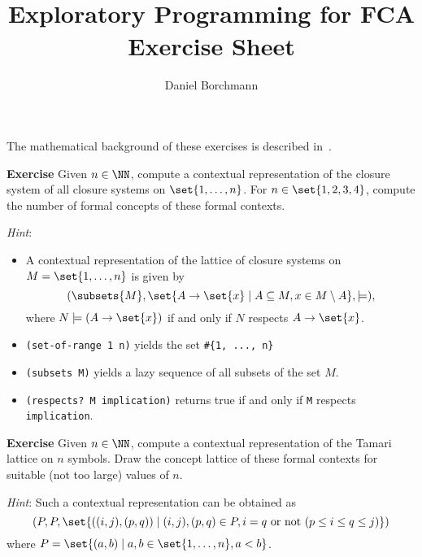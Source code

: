 \documentclass{article}
\title{\cclj\\ Exploratory Programming for FCA\\ Exercise Sheet}
\author{Daniel Borchmann}
\newcounter{exercise}
\newenvironment{exercise}{\bigskip\stepcounter{exercise}\noindent\begingroup\textbf{Exercise
    \theexercise}\hspace*{.3cm}}{\endgroup}
\newcommand{\hint}{\medskip\noindent\emph{Hint}: }
\begin{document}
\maketitle

\noindent The mathematical background of these exercises is described in~\cite{fca-book}.

\begin{exercise}
  Given $n \in \NN$, compute a contextual representation of the closure system of all
  closure systems on $\set{ 1, \ldots, n }$.  For $n \in \set{1,2,3,4}$, compute the
  number of formal concepts of these formal contexts.

  \hint
  \begin{itemize}
  \item A contextual representation of the lattice of closure systems on $M =
    \set{1,\ldots, n}$ is given by
    \begin{equation*}
      (\subsets{M}, \set{ A \to \set{x} \mid A \subseteq M, x \in M \setminus A }, \models),
    \end{equation*}
    where $N \models (A \to \set{x})$ if and only if $N$ respects $A \to \set{x}$.
  \item \texttt{(set-of-range 1 n)} yields the set \texttt{\#\{1, ..., n\}}
  \item \texttt{(subsets M)} yields a lazy sequence of all subsets of the set $M$.
  \item \texttt{(respects?\ M implication)} returns true if and only if \texttt{M} respects
    \texttt{implication}.
  \end{itemize}
\end{exercise}

\begin{exercise}
  Given $n \in \NN$, compute a contextual representation of the Tamari lattice on $n$
  symbols.  Draw the concept lattice of these formal contexts for suitable (\ie not too
  large) values of $n$.

  \hint Such a contextual representation can be obtained as
  \begin{equation*}
    (P, P, \set{ ((i, j), (p, q)) \mid (i,j),(p,q) \in P, i = q \text{ or not }
      (p \le i \le q \le j) })
  \end{equation*}
  where $P = \set{ (a, b) \mid a, b \in \set{ 1, \ldots, n }, a < b }$.
\end{exercise}

\pagebreak
\end{document}
